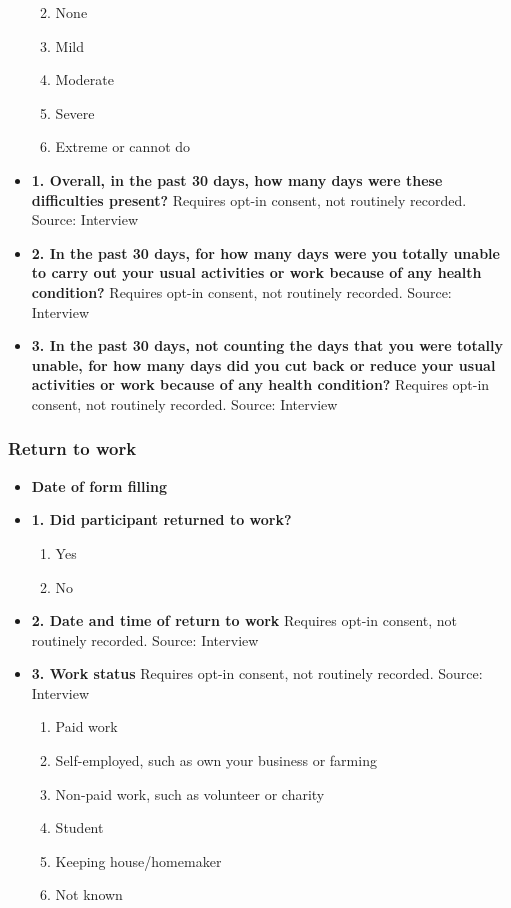 \documentclass[
]{scrartcl}
\providecommand{\tightlist}{%
  \setlength{\itemsep}{0pt}\setlength{\parskip}{0pt}}\usepackage{longtable,booktabs,array}
\begin{document}
\begin{itemize}
  \begin{enumerate}
  \def\labelenumi{\arabic{enumi}.}
  \tightlist
  \item
    None
  \item
    Mild
  \item
    Moderate
  \item
    Severe
  \item
    Extreme or cannot do
  \end{enumerate}
\item
  \textbf{1. Overall, in the past 30 days, how many days were these
  difficulties present?} Requires opt-in consent, not routinely
  recorded. Source: Interview
\item
  \textbf{2. In the past 30 days, for how many days were you totally
  unable to carry out your usual activities or work because of any
  health condition?} Requires opt-in consent, not routinely recorded.
  Source: Interview
\item
  \textbf{3. In the past 30 days, not counting the days that you were
  totally unable, for how many days did you cut back or reduce your
  usual activities or work because of any health condition?} Requires
  opt-in consent, not routinely recorded. Source: Interview
\end{itemize}

\hypertarget{return-to-work}{%
\subsubsection{Return to work}\label{return-to-work}}

\begin{itemize}
\item
  \textbf{Date of form filling}
\item
  \textbf{1. Did participant returned to work?}

  \begin{enumerate}
  \def\labelenumi{\arabic{enumi}.}
  \tightlist
  \item
    Yes
  \item
    No
  \end{enumerate}
\item
  \textbf{2. Date and time of return to work} Requires opt-in consent,
  not routinely recorded. Source: Interview
\item
  \textbf{3. Work status} Requires opt-in consent, not routinely
  recorded. Source: Interview

  \begin{enumerate}
  \def\labelenumi{\arabic{enumi}.}
  \tightlist
  \item
    Paid work
  \item
    Self-employed, such as own your business or farming
  \item
    Non-paid work, such as volunteer or charity
  \item
    Student
  \item
    Keeping house/homemaker
  \item
    Not known
  \end{enumerate}
\end{itemize}
\end{document}
